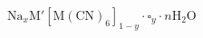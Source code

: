 \documentclass[preview]{standalone}
\begin{document}
$\text{Na}_x\text{M}'[\text{M}(\text{CN})_6]_{1-y} \cdot \square_y \cdot n\text{H}_2\text{O}$
\end{document}

